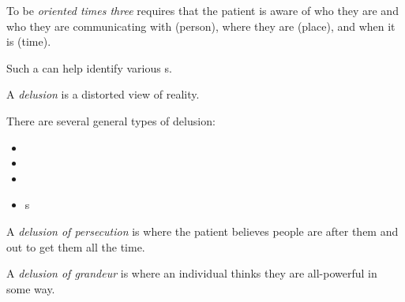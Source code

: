 \begin{definition}\label{def:Oriented_Times_Three}
  To be \emph{oriented times three} requires that the patient is aware of who they are and who they are communicating with (person), where they are (place), and when it is (time).
\end{definition}

Such a  can help identify various s.

\begin{definition}[Delusion]\label{def:Delusion}
  A \emph{delusion} is a distorted view of reality.

  There are several general types of delusion:
  \begin{itemize}[noitemsep]
  \item {}
  \item {}
  \item {}
  \item {}s
  \end{itemize}
\end{definition}

\begin{definition}\label{def:Delusion_of_Persecution}
  A \emph{delusion of persecution} is where the patient believes people are after them and out to get them all the time.
\end{definition}

\begin{definition}\label{def:Delusion_of_Grandeur}
  A \emph{delusion of grandeur} is where an individual thinks they are all-powerful in some way.
\end{definition}



